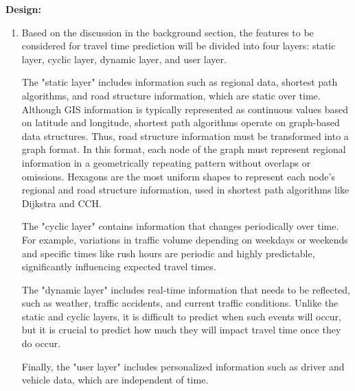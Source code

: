 \documentclass[12pt]{exam}
\begin{document}
\textbf{Design:} 
\begin{enumerate}
  \item Based on the discussion in the background section, the features to be considered for travel time prediction will be divided into four layers: static layer, cyclic layer, dynamic layer, and user layer.

  The "static layer" includes information such as regional data, shortest path algorithms, and road structure information, which are static over time. Although GIS information is typically represented as continuous values based on latitude and longitude, shortest path algorithms operate on graph-based data structures. Thus, road structure information must be transformed into a graph format. In this format, each node of the graph must represent regional information in a geometrically repeating pattern without overlaps or omissions. Hexagons are the most uniform shapes to represent each node’s regional and road structure information, used in shortest path algorithms like Dijkstra and CCH.
  
  The "cyclic layer" contains information that changes periodically over time. For example, variations in traffic volume depending on weekdays or weekends and specific times like rush hours are periodic and highly predictable, significantly influencing expected travel times.
  
  The "dynamic layer" includes real-time information that needs to be reflected, such as weather, traffic accidents, and current traffic conditions. Unlike the static and cyclic layers, it is difficult to predict when such events will occur, but it is crucial to predict how much they will impact travel time once they do occur.
  
  Finally, the "user layer" includes personalized information such as driver and vehicle data, which are independent of time.
  
\end{enumerate}
\end{document}
